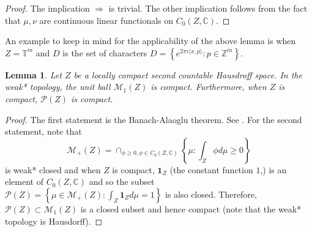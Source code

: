 \documentclass[reqno,11pt, twoside]{amsart}
\theoremstyle{plain}
\newtheorem{lem}[thm]{Lemma}
\theoremstyle{definition}
\theoremstyle{definition}
\theoremstyle{remark}
\numberwithin{equation}{section}
\newcommand\ca[1]{\mathcal{#1}}
\newcommand{\Co}{{\mathbb{C}}}
\newcommand{\ignore}[1]{{}}
\newcommand{\cM}{\mathcal{M}}
\newcommand{\cP}{\mathcal{P}}
\newcommand{\bC}{\mathbb{C}}
\newcommand{\bZ}{\mathbb{Z}}
\newcommand{\bT}{\mathbb{T}}
\newcommand\seta[1]{\left\{#1\right\}}
\newcommand\idist[1]{\langle#1\rangle}
\newcommand\mb[1]{\mathbf{#1}}
\begin{document}
\begin{proof}
    The implication $\Longrightarrow$ is trivial. The other implication follows from the fact that $\mu,\nu$ are continuous linear functionals on $C_0(Z,\bC)$.
    \ignore{
    Since integration is bilinear (over functions and measures), it suffices to prove the Lemma when $\nu=0$. The forward direction is clear. We prove the other direction. Let $\psi \in C_0(Z,\Co)$ be arbitrary. Let $\varepsilon>0$ be arbitrary.
    We compute, for $\phi\in D$,
    \begin{equation*}
        \begin{split}
            \left| \int_{Z} \psi d\mu \right| &= 
            \left| \int_Z (\psi - \phi) d\mu \right|
            \\
            &\leq \|\psi - \phi\| \cdot \|\mu\|
        \end{split}
    \end{equation*}
    where $\|\mu\|$ denotes norm in $\ca{M}(Z)$ and $\|\psi - \phi\|$ denotes the norm in $C_0(Z,\Co)$. 
    Thus, if we choose $\phi \in D$ which has
    \begin{equation*}
        \|\psi - \phi\| < \varepsilon \|\mu\|^{-1}
    \end{equation*}
    (assuming that $\mu$ is nonzero), we get
    \begin{equation*}
        \left|\int_Z \psi d\mu \right| < \varepsilon.
    \end{equation*}
    By the duality of $\mathcal{M}(Z)$ and $C_0(Z,\Co)$, we are done.
    }
\end{proof}
An example to keep in mind for the applicability of the above lemma is when 
$Z=\bT^m$ and $D$ is the set of characters $D=\seta{e^{2\pi i\idist{x,p}}:p\in \bZ^m}.$
\ignore{With respect to the preceeding Definition and Lemma, we remark there can exist nonzero, nonregular Borel measures on $Z$ which give rise to the zero functional on $C_0(Z,\Co)$. See \cite[Chapter 2, exercise 18]{Ru-RACA}.
}
\begin{lem}\label{lem: B-A}
    Let $Z$ be a locally compact second countable Hausdroff space. In the weak* topology, the unit ball $\ca{M}_1(Z)$ is compact. Furthermore, when $Z$ is compact, $\cP(Z)$ is compact.
\end{lem}
\begin{proof}
    The first statement is the Banach-Alaoglu theorem. See \cite[Theorem 3.15]{Ru-FA}. For the second statement, note that 
    $$\cM_+(Z) = \cap_{\phi\ge 0, \phi\in C_0(Z,\bC)}\seta{\mu:\int_Z\phi d\mu\ge 0}$$ 
    is weak* closed and when $Z$ is compact, $\mb{1}_Z$ (the constant function $1$,) is an element of $C_0(Z,\bC)$ and so the subset $\cP(Z)= \seta{\mu\in \cM_+(Z):\int_Z\mb{1}_Z d\mu = 1}$ is also closed. Therefore, $\cP(Z)\subset \cM_1(Z)$ is a closed subset and hence compact (note that the weak* topology is Hausdorff). 
\end{proof}
\end{document}
